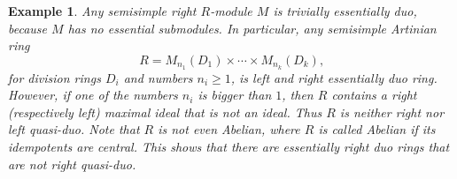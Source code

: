 \documentclass{amsart}
\theoremstyle{plain}
\newtheorem{example}[theorem]{Example}
\numberwithin{equation}{section}
\begin{document}
\begin{example}
\label{Example of essentially duo that is not quasi-duo}
Any semisimple right $R$-module $M$ is trivially essentially duo, because $M$ has no essential submodules. In particular, any semisimple Artinian ring
\begin{equation*}R =M_{n_{1}} (D_{1}) \times \cdots  \times M_{n_{k}} (D_{k})\text{,}
\end{equation*}for division rings $D_{i}$ and numbers $n_{i} \geq 1$, is left and right essentially duo ring. However, if one of the numbers $n_{i}$ is bigger than $1$, then $R$ contains a right (respectively left) maximal ideal that is not an ideal. Thus $R$ is neither right nor left quasi-duo. Note that $R$ is not even Abelian, where $R$ is called Abelian if its idempotents are central. This shows that there are essentially right duo rings that are not right quasi-duo.



\end{example}
\end{document}
